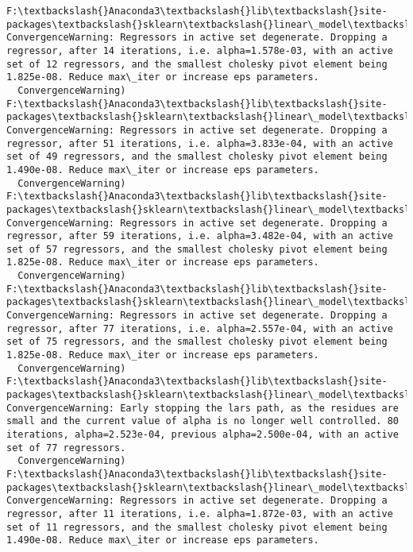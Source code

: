 \documentclass[11pt]{article}
\begin{document}
    \begin{Verbatim}[commandchars=\\\{\}]
F:\textbackslash{}Anaconda3\textbackslash{}lib\textbackslash{}site-packages\textbackslash{}sklearn\textbackslash{}linear\_model\textbackslash{}least\_angle.py:313: ConvergenceWarning: Regressors in active set degenerate. Dropping a regressor, after 14 iterations, i.e. alpha=1.578e-03, with an active set of 12 regressors, and the smallest cholesky pivot element being 1.825e-08. Reduce max\_iter or increase eps parameters.
  ConvergenceWarning)
F:\textbackslash{}Anaconda3\textbackslash{}lib\textbackslash{}site-packages\textbackslash{}sklearn\textbackslash{}linear\_model\textbackslash{}least\_angle.py:313: ConvergenceWarning: Regressors in active set degenerate. Dropping a regressor, after 51 iterations, i.e. alpha=3.833e-04, with an active set of 49 regressors, and the smallest cholesky pivot element being 1.490e-08. Reduce max\_iter or increase eps parameters.
  ConvergenceWarning)
F:\textbackslash{}Anaconda3\textbackslash{}lib\textbackslash{}site-packages\textbackslash{}sklearn\textbackslash{}linear\_model\textbackslash{}least\_angle.py:313: ConvergenceWarning: Regressors in active set degenerate. Dropping a regressor, after 59 iterations, i.e. alpha=3.482e-04, with an active set of 57 regressors, and the smallest cholesky pivot element being 1.825e-08. Reduce max\_iter or increase eps parameters.
  ConvergenceWarning)
F:\textbackslash{}Anaconda3\textbackslash{}lib\textbackslash{}site-packages\textbackslash{}sklearn\textbackslash{}linear\_model\textbackslash{}least\_angle.py:313: ConvergenceWarning: Regressors in active set degenerate. Dropping a regressor, after 77 iterations, i.e. alpha=2.557e-04, with an active set of 75 regressors, and the smallest cholesky pivot element being 1.825e-08. Reduce max\_iter or increase eps parameters.
  ConvergenceWarning)
F:\textbackslash{}Anaconda3\textbackslash{}lib\textbackslash{}site-packages\textbackslash{}sklearn\textbackslash{}linear\_model\textbackslash{}least\_angle.py:339: ConvergenceWarning: Early stopping the lars path, as the residues are small and the current value of alpha is no longer well controlled. 80 iterations, alpha=2.523e-04, previous alpha=2.500e-04, with an active set of 77 regressors.
  ConvergenceWarning)
F:\textbackslash{}Anaconda3\textbackslash{}lib\textbackslash{}site-packages\textbackslash{}sklearn\textbackslash{}linear\_model\textbackslash{}least\_angle.py:313: ConvergenceWarning: Regressors in active set degenerate. Dropping a regressor, after 11 iterations, i.e. alpha=1.872e-03, with an active set of 11 regressors, and the smallest cholesky pivot element being 1.490e-08. Reduce max\_iter or increase eps parameters.

\end{Verbatim}
\end{document}
